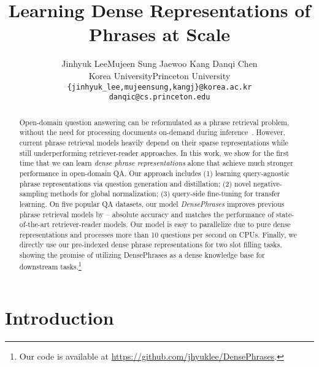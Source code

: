 \documentclass[11pt,a4paper]{article}
\title{Learning Dense Representations of Phrases at Scale}
\author{
  Jinhyuk Lee\quad Mujeen Sung \quad Jaewoo Kang \quad Danqi Chen\\
  Korea University\quad Princeton University\\
  \texttt{\{jinhyuk\_lee,mujeensung,kangj\}@korea.ac.kr} \\
  \texttt{danqic@cs.princeton.edu} \\}
\date{}
\newcommand\ti[1]{\textit{#1}}
\begin{document}
\maketitle



\begin{abstract}











Open-domain question answering can be reformulated as a phrase retrieval problem, without the need for processing documents on-demand during inference~\citep{seo2019real}.
However, current phrase retrieval models heavily depend on their sparse representations while still underperforming retriever-reader approaches.
In this work, we show for the first time that we can learn \ti{dense phrase representations} alone that achieve much stronger performance in open-domain QA. Our approach includes (1) learning query-agnostic phrase representations via question generation and distillation; (2) novel negative-sampling methods for global normalization; (3) query-side fine-tuning for transfer learning.
On five popular QA datasets, our model \ti{DensePhrases} improves previous phrase retrieval models by -- absolute accuracy and matches the performance of state-of-the-art retriever-reader models.
Our model is easy to parallelize due to pure dense representations and processes more than 10 questions per second on CPUs.
Finally, we directly use our pre-indexed dense phrase representations for two slot filling tasks, showing the promise of utilizing {DensePhrases} as a dense knowledge base for downstream tasks.\footnote{Our code is available at \url{https://github.com/jhyuklee/DensePhrases}.}








\end{abstract}
 

\section{Introduction}
\label{sec:intro}
\end{document}
